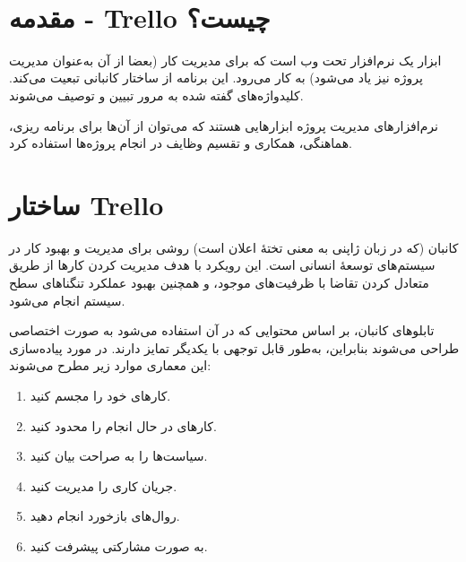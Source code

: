 \documentclass[]{article}
\begin{document}
\newpage
\pagestyle{fancy}
\fancyhf{}
\fancyfoot{}
\cfoot{\thepage}
\renewcommand{\headrulewidth}{2pt}

\KashidaOff


 \Large \textbf{\\
}


\section*{{\titr مقدمه - Trello چیست؟}}

ابزار  یک نرم‌افزار تحت وب است که برای مدیریت کار (بعضا از آن به‌عنوان مدیریت پروژه نیز یاد می‌شود) به کار می‌رود. این برنامه از ساختار کانبانی تبعیت می‌کند. کلید‌واژه‌های گفته شده به مرور تبیین و توصیف می‌شوند.

نرم‌افزارهای مدیریت پروژه ابزارهایی هستند که می‌توان از آن‌ها برای برنامه ریزی، هماهنگی، همکاری و تقسیم وظایف در انجام پروژه‌ها استفاده کرد.

\begin{center}



\end{center}

\newpage

\section*{{\titr ساختار Trello}}

کانبان (که در زبان ژاپنی به معنی تختهٔ اعلان است) روشی برای مدیریت و بهبود کار در سیستم‌های توسعهٔ انسانی است. این رویکرد با هدف مدیریت کردن کارها از طریق متعادل کردن تقاضا با ظرفیت‌های موجود، و همچنین بهبود عملکرد تنگناهای سطح سیستم انجام می‌شود.

تابلوهای کانبان، بر اساس محتوایی که در آن استفاده می‌شود به صورت اختصاصی طراحی می‌شوند بنابراین، به‌طور قابل توجهی با یکدیگر تمایز دارند. در مورد پیاده‌سازی این معماری موارد زیر مطرح می‌شوند:

\begin{enumerate}
\item
کارهای خود را مجسم کنید.

\item
کارهای در حال انجام را محدود کنید.

\item
سیاست‌ها را به صراحت بیان کنید.

\item
جریان کاری را مدیریت کنید.

\item
روال‌های بازخورد انجام دهید.

\item
به صورت مشارکتی پیشرفت کنید.

\end{enumerate}
\end{document}
